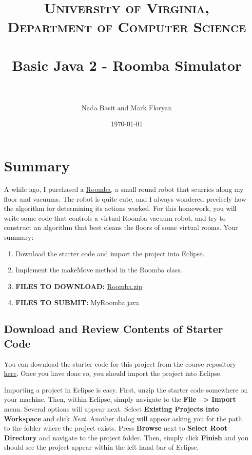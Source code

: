 \documentclass[paper=a4, fontsize=11pt, parskip=full]{scrartcl} %
\title{
\normalfont \normalsize
\textsc{University of Virginia, Department of Computer Science} \\ [25pt] %
\horrule{0.5pt} \\[0.4cm] %
\huge Basic Java 2 - Roomba Simulator \\ %
\horrule{2pt} \\[0.5cm] %
}
\author{Nada Basit and Mark Floryan}
\date{\normalsize\today} %
\numberwithin{equation}{section} %
\numberwithin{figure}{section} %
\numberwithin{table}{section} %
\begin{document}
\maketitle %


\section{Summary}

A while ago, I purchased a \href{https://www.irobot.com/For-the-Home/Vacuuming/Roomba.aspx}{Roomba}, a small round robot that scurries along my floor and vacuums. The robot is quite cute, and I always wondered precisely how the algorithm for determining its actions worked. For this homework, you will write some code that controls a virtual Roomba vacuum robot, and try to construct an algorithm that best cleans the floors of some virtual rooms. Your summary:

\begin{enumerate}
	\item Download the starter code and import the project into Eclipse.
	\item Implement the makeMove method in the Roomba class.
	\item \textbf{FILES TO DOWNLOAD:} \href{https://uva-cs.github.io/dsa1/homeworks/BasicJava2/code/Roomba.zip}{Roomba.zip}
	\item \textbf{FILES TO SUBMIT:} MyRoomba.java
\end{enumerate}


\subsection{Download and Review Contents of Starter Code}

You can download the starter code for this project from the course repository \href{https://uva-cs.github.io/dsa1/homeworks/BasicJava2/code/Roomba.zip}{here}. Once you have done so, you should import the project into Eclipse.

Importing a project in Eclipse is easy. First, unzip the starter code somewhere on your machine. Then, within Eclipse, simply navigate to the \textbf{File --> Import} menu. Several options will appear next. Select \textbf{Existing Projects into Workspace} and click \emph{Next}. Another dialog will appear asking you for the path to the folder where the project exists. Press \textbf{Browse} next to \textbf{Select Root Directory} and navigate to the project folder. Then, simply click \textbf{Finish} and you should see the project appear within the left hand bar of Eclipse.
\end{document}

